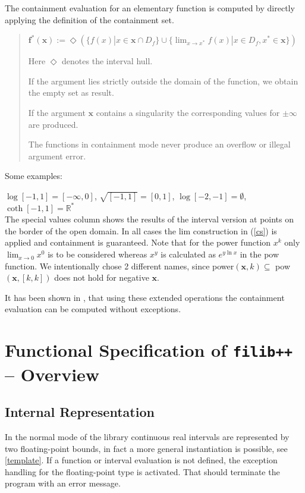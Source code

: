 \documentclass{report}
\newcommand{\R}{\mathbb{R}}
\newcommand{\xx}{\mathbf{x}}
\newcommand{\ff}{\mathbf{f}}
\begin{document}
The containment evaluation for an elementary function is computed by directly
applying the definition of the containment set.
\begin{quote}
$\ff^*(\xx):= \Diamond(  \{f(x)| x \in \xx \cap D_f\}  \cup \{ \lim_{x\rightarrow x^*} f(x) | x
\in D_f, x^* \in \xx\} )$

Here $\Diamond$ denotes the interval hull.

 If the argument lies strictly outside
the domain of the function, we obtain the empty set as result.

If the argument $\xx$ contains a singularity the corresponding values
for $\pm \infty$ are produced.

The functions in containment mode never produce an overflow or illegal argument error.
\end{quote}


Some examples:

$\log[-1,1] = [-\infty,0] $, $\sqrt{[-1,1]} = [0,1]$, $\log[-2,-1]=\emptyset$, $\coth[-1,1]=\R^\ast$\\

The special values column shows the results of the interval version at points
		on the border of the open domain. In all cases the lim construction in (\ref{cs})
		is applied and containment is guaranteed. Note that for the
		power  function $x^k$ only
		$\lim_{x \rightarrow 0} x^0 $ is to be considered whereas $x^y$ is calculated
		as $e^{y \ln x}$ in the pow function. We intentionally chose 2
		different names, since power$(\xx,k) \subseteq $
		pow$(\xx,[k,k])$ does not hold for negative $\xx$.

It has been shown in \cite{ext,simple}, that using these extended operations
 the containment evaluation can be
computed without exceptions.


\section{Functional Specification of \texttt{filib++} -- Overview}
\subsection{Internal Representation}
\label{intrep}

In the normal mode of the library continuous real intervals are represented by
two floating-point bounds, in fact a more general instantiation is possible,
see \ref{template}.
If a function or interval evaluation is not defined, the  exception
handling  for the floating-point type is activated. That should terminate the
program with an error message.
\end{document}
